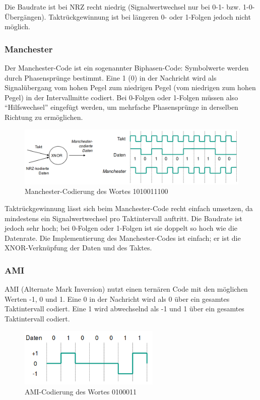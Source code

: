 \documentclass[a4paper, 14pt]{article}
\begin{document}
	Die Baudrate ist bei NRZ recht niedrig (Signalwertwechsel nur bei 0-1- bzw. 1-0-Übergängen).
	Taktrückgewinnung ist bei längeren 0- oder 1-Folgen jedoch nicht möglich.

	\subsubsection{Manchester}

	Der Manchester-Code ist ein sogenannter Biphasen-Code: Symbolwerte werden durch Phasensprünge bestimmt.
	Eine 1 (0) in der Nachricht wird als Signalübergang vom hohen Pegel zum niedrigen Pegel (vom niedrigen zum hohen Pegel) in der Intervallmitte codiert.
	Bei 0-Folgen oder 1-Folgen müssen also \enquote{Hilfswechsel} eingefügt werden, um mehrfache Phasensprünge in derselben Richtung zu ermöglichen.

	\begin{figure}
		\includegraphics[width=\textwidth]{images/03-manchester.png}
		\caption{Manchester-Codierung des Wortes 1010011100}
	\end{figure}

	Taktrückgewinnung lässt sich beim Manchester-Code recht einfach umsetzen, da mindestens ein Signalwertwechsel pro Taktintervall auftritt.
	Die Baudrate ist jedoch sehr hoch; bei 0-Folgen oder 1-Folgen ist sie doppelt so hoch wie die Datenrate.
	Die Implementierung des Manchester-Codes ist einfach; er ist die XNOR-Verknüpfung der Daten und des Taktes.

	\subsubsection{AMI}

	AMI (Alternate Mark Inversion) nutzt einen ternären Code mit den möglichen Werten -1, 0 und 1.
	Eine 0 in der Nachricht wird als 0 über ein gesamtes Taktintervall codiert.
	Eine 1 wird abwechselnd als -1 und 1 über ein gesamtes Taktintervall codiert.

	\begin{figure}
		\begin{center}
			\includegraphics[width=0.6\textwidth]{images/03-ami.png}
		\end{center}
		\caption{AMI-Codierung des Wortes 0100011}
	\end{figure}
\end{document}
